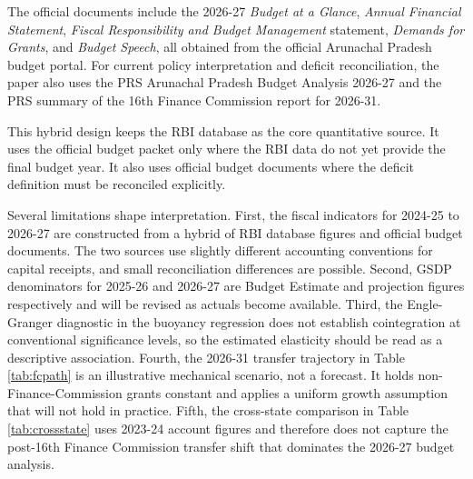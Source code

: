 \documentclass[11pt,a4paper]{article}
\begin{document}
The official documents include the 2026-27 \emph{Budget at a Glance}, \emph{Annual Financial Statement}, \emph{Fiscal Responsibility and Budget Management} statement, \emph{Demands for Grants}, and \emph{Budget Speech}, all obtained from the official Arunachal Pradesh budget portal. For current policy interpretation and deficit reconciliation, the paper also uses the PRS Arunachal Pradesh Budget Analysis 2026-27 and the PRS summary of the 16th Finance Commission report for 2026-31.

This hybrid design keeps the RBI database as the core quantitative source. It uses the official budget packet only where the RBI data do not yet provide the final budget year. It also uses official budget documents where the deficit definition must be reconciled explicitly.

Several limitations shape interpretation. First, the fiscal indicators for 2024-25 to 2026-27 are constructed from a hybrid of RBI database figures and official budget documents. The two sources use slightly different accounting conventions for capital receipts, and small reconciliation differences are possible. Second, GSDP denominators for 2025-26 and 2026-27 are Budget Estimate and projection figures respectively and will be revised as actuals become available. Third, the Engle-Granger diagnostic in the buoyancy regression does not establish cointegration at conventional significance levels, so the estimated elasticity should be read as a descriptive association. Fourth, the 2026-31 transfer trajectory in Table \ref{tab:fcpath} is an illustrative mechanical scenario, not a forecast. It holds non-Finance-Commission grants constant and applies a uniform growth assumption that will not hold in practice. Fifth, the cross-state comparison in Table \ref{tab:crossstate} uses 2023-24 account figures and therefore does not capture the post-16th Finance Commission transfer shift that dominates the 2026-27 budget analysis.
\end{document}
